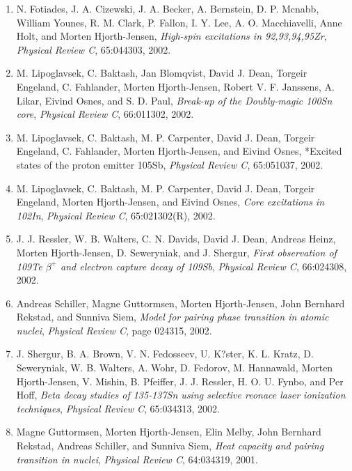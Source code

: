 \documentclass[a4wide,10pt]{article}
\begin{document}
\begin{enumerate}
\item N. Fotiades, J. A. Cizewski, J. A. Becker, A. Bernstein, D. P. Mcnabb, William   Younes, R. M. Clark, P. Fallon, I. Y. Lee, A. O. Macchiavelli, Anne Holt, and   Morten Hjorth-Jensen, \emph{High-spin excitations in 92,93,94,95Zr}, \emph{Physical Review C}, 65:044303, 2002. 

\item M. Lipoglavsek, C. Baktash, Jan Blomqvist, David J. Dean, Torgeir Engeland,   C. Fahlander, Morten Hjorth-Jensen, Robert V. F. Janssens, A. Likar, Eivind   Osnes, and S. D. Paul, \emph{Break-up of the Doubly-magic 100Sn core},  \emph{Physical Review C}, 66:011302, 2002. 

\item M. Lipoglavsek, C. Baktash, M. P. Carpenter, David J. Dean, Torgeir Engeland,   C. Fahlander, Morten Hjorth-Jensen, and Eivind Osnes, *Excited states of the proton emitter 105Sb, \emph{Physical Review C}, 65:051037, 2002. 

\item M. Lipoglavsek, C. Baktash, M. P. Carpenter, David J. Dean, Torgeir Engeland,   Morten Hjorth-Jensen, and Eivind Osnes, \emph{Core excitations in 102In},  \emph{Physical Review C}, 65:021302(R), 2002. 

\item J. J. Ressler, W. B. Walters, C. N. Davids, David J. Dean, Andreas Heinz,   Morten Hjorth-Jensen, D. Seweryniak, and J. Shergur, \emph{First observation of 109Te $\beta^+$ and electron capture  decay of 109Sb},  \emph{Physical Review C}, 66:024308, 2002. 

\item Andreas Schiller, Magne Guttormsen, Morten Hjorth-Jensen, John Bernhard   Rekstad, and Sunniva Siem, \emph{Model for pairing phase transition in atomic nuclei},   \emph{Physical Review C}, page 024315, 2002. 

\item J. Shergur, B. A. Brown, V. N. Fedosseev, U. K?ster, K. L. Kratz,   D. Seweryniak, W. B. Walters, A. Wohr, D. Fedorov, M. Hannawald, Morten   Hjorth-Jensen, V. Mishin, B. Pfeiffer, J. J. Ressler, H. O. U. Fynbo, and Per   Hoff, \emph{Beta decay studies of 135-137Sn using selective reonace   laser ionization techniques}, \emph{Physical Review C}, 65:034313, 2002. 

\item Magne Guttormsen, Morten Hjorth-Jensen, Elin Melby, John Bernhard Rekstad,   Andreas Schiller, and Sunniva Siem, \emph{Heat capacity and pairing transition in nuclei},  \emph{Physical Review C}, 64:034319, 2001. 


\end{enumerate}
\end{document}
